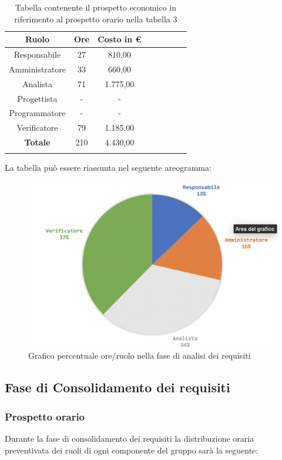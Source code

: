 			\begin{longtable}{|c|c|c|c|c|c|c|c|}
				\hline
				\rowcolor{lighter-grayer}
				\textbf{Ruolo} & \textbf{Ore} & \textbf{Costo in €} \\
				\hline
				\endfirsthead
				
				\hline
				Responsabile & 27 & 810,00\\
				\hline
				\hline
				Amministratore & 33 & 660,00\\
				\hline
				\hline
				Analista & 71 & 1.775,00\\
				\hline
				\hline
				Progettista & - & -\\
				\hline
				\hline
				Programmatore & - & -\\
				\hline
				\hline
				Verificatore & 79 & 1.185,00\\
				\hline
				\textbf{Totale} & 210 & 4.430,00\\
				\hline
				\caption{Tabella contenente il prospetto economico in riferimento al prospetto orario nella tabella 3}
			\end{longtable}
			\pagebreak
		
			La tabella può essere riassunta nel seguente areogramma:
			\begin{figure}[H]
				\centering
				\includegraphics[width=0.8\linewidth]{./images/analisi2.png}
				\caption{Grafico percentuale ore/ruolo nella fase di analisi dei requisiti}
				\label{fig:grafico costi ruolo fase analisi dei requisiti}
			\end{figure}
		
	\subsection{Fase di Consolidamento dei requisiti}
			\subsubsection{Prospetto orario}
			Durante la fase di consolidamento dei requisiti la distribuzione oraria preventivata dei ruoli di ogni componente del gruppo sarà la seguente:
			

